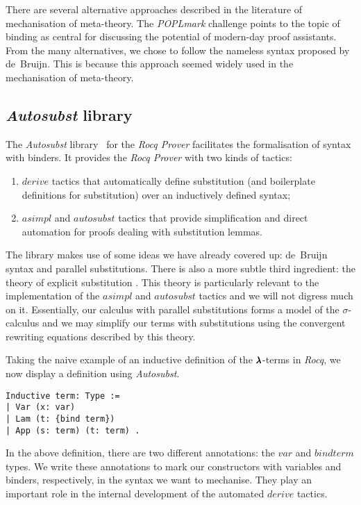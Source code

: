 There are several alternative approaches described in the literature of mechanisation of meta-theory. 
The \textit{POPLmark} challenge \cite{POPLmark} points to the topic of binding as central for discussing the potential of modern-day proof assistants.
From the many alternatives, we chose to follow the nameless syntax proposed by de~Bruijn.
This is because this approach seemed widely used in the mechanisation of meta-theory.

\subsection{\textit{Autosubst} library}

The \textit{Autosubst} library~\cite{AutosubstSchafer,AutosubstManual} for the \textit{Rocq Prover} facilitates the formalisation of syntax with binders.
It provides the \textit{Rocq Prover} with two kinds of tactics:
\begin{enumerate}
  \item \lst$derive$ tactics that automatically define substitution (and boilerplate definitions for substitution) over an inductively defined syntax;
  \item \lst$asimpl$ and \lst$autosubst$ tactics that provide simplification and direct automation for proofs dealing with substitution lemmas.
\end{enumerate}

The library makes use of some ideas we have already covered up: de~Bruijn syntax and parallel substitutions.
There is also a more subtle third ingredient: the theory of explicit substitution \cite{Abadi}.
This theory is particularly relevant to the implementation of the \lst$asimpl$ and \lst$autosubst$ tactics and we will not digress much on it.
Essentially, our calculus with parallel substitutions forms a model of the $\sigma$-calculus and we may simplify our terms with substitutions using the convergent rewriting equations described by this theory.

Taking the naive example of an inductive definition of the $\pmb{\lambda}$-terms in \textit{Rocq}, we now display a definition using \textit{Autosubst}.

\begin{lstlisting}[language=Coq]
Inductive term: Type :=
| Var (x: var)
| Lam (t: {bind term})
| App (s: term) (t: term) .
\end{lstlisting}

In the above definition, there are two different annotations: the \lst$var$ and \lst${bind term}$ types.
We write these annotations to mark our constructors with variables and binders, respectively, in the syntax we want to mechanise.
They play an important role in the internal development of the automated \lst$derive$ tactics.

